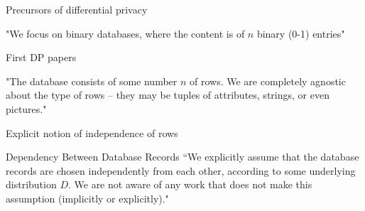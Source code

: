 \documentclass[12pt,aspectratio=169,handout]{beamer}
\begin{document}
\begin{frame}{Precursors of differential privacy}

"We focus on binary databases, where the content is of $n$ binary (0-1) entries"


\end{frame}



\begin{frame}{First DP papers}

"The database consists of some number $n$ of rows. We are completely agnostic about the type of rows – they may be tuples of attributes, strings, or even pictures."

\end{frame}


\begin{frame}{Explicit notion of independence of rows}


\begin{block}{Dependency Between Database Records}
``We explicitly assume that the database records are chosen independently from each other, according to some underlying distribution $D$. We are not aware of any work that does not make this assumption (implicitly or explicitly)."
\end{block}


\end{frame}
\end{document}
